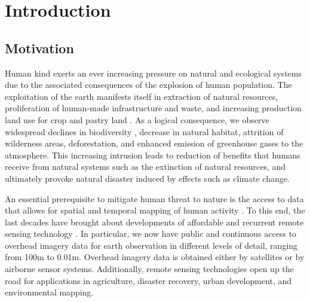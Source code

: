 
\chapter{Introduction}

\label{Chapter1}


\section{Motivation}
Human kind exerts an ever increasing pressure on natural and ecological systems due to the associated consequences of the explosion of human population. The exploitation of the earth manifests itself in extraction of natural resources, proliferation of human-made infrastructure and waste, and increasing production land use for crop and pastry land \parencite{kareiva2007}. As a logical consequence, we observe widespread declines in biodiversity \parencite{newbold2015}, 
decrease in natural habitat, attrition of wilderness areas, deforestation, and enhanced emission of greenhouse gases to the atmosphere. This increasing intrusion leads to reduction of benefits that humans receive from natural systems \parencite{costanza2014} such as the extinction of natural resources, and ultimately provoke natural disaster induced by effects such as climate change. 

An essential prerequisite to mitigate human threat to nature is the access to data that allows for spatial and temporal mapping of human activity \parencite{raiter2014}. To this end, the last decades have brought about developments of affordable and recurrent remote sensing technology \parencite{hansen2013}. In particular, we now have public and continuous access to overhead imagery data for earth observation in different levels of detail, ranging from 100m to 0.01m. Overhead imagery data is obtained either by satellites or by airborne sensor systems. Additionally, remote sensing technologies open up the road for applications in agriculture, disaster recovery, urban development, and environmental mapping.

